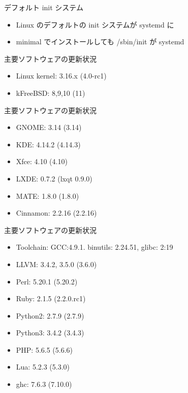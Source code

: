 \begin{frame}{デフォルト init システム}

\begin{itemize}
\item Linux のデフォルトの init システムが systemd に
\item minimal でインストールしても /sbin/init が systemd
\end{itemize}

\end{frame}

\begin{frame}{主要ソフトウェアの更新状況}

\begin{itemize}
\item Linux kernel: 3.16.x (4.0-rc1)
\item kFreeBSD: 8,9,10 (11)
\end{itemize}

\end{frame}

\begin{frame}{主要ソフトウェアの更新状況}
\begin{itemize}
\item GNOME: 3.14 (3.14)
\item KDE: 4.14.2 (4.14.3)
\item Xfce: 4.10 (4.10)
\item LXDE: 0.7.2 (lxqt 0.9.0)
\item MATE: 1.8.0 (1.8.0)
\item Cinnamon: 2.2.16 (2.2.16)
\end{itemize}
\end{frame}

\begin{frame}{主要ソフトウェアの更新状況}
\begin{itemize}
\item Toolchain: GCC:4.9.1. binutils: 2.24.51, glibc: 2:19
\item LLVM: 3.4.2, 3.5.0 (3.6.0)
\item Perl: 5.20.1 (5.20.2)
\item Ruby: 2.1.5 (2.2.0.rc1)
\item Python2: 2.7.9 (2.7.9)
\item Python3: 3.4.2 (3.4.3)
\item PHP: 5.6.5 (5.6.6)
\item Lua: 5.2.3 (5.3.0)
\item ghc: 7.6.3 (7.10.0)
\end{itemize}
\end{frame}

